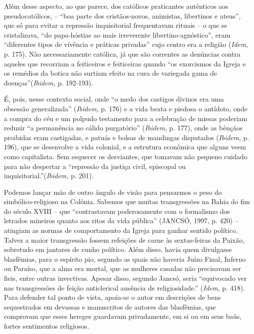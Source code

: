 Além desse aspecto, ao que parece, dos católicos praticantes autênticos
aos pseudocatólicos, -- ``boa parte dos cristãos-novos, animistas,
libertinos e ateus'', que só para evitar a repressão inquisitorial
frequentavam rituais -- o que se cristalizava, ``do papa-hóstias ao mais
irreverente libertino-agnóstico'', eram ``diferentes tipos de vivência e
práticas privadas'' cujo centro era a religião (\emph{Idem}, p. 175).
Não necessariamente católica, já que são correntes as denúncias contra
aqueles que recorriam a feiticeiros e feiticeiras quando ``os exorcismos
da Igreja e os remédios da botica não surtiam efeito na cura de
variegada gama de doenças''(\emph{Ibidem,} p. 192-193).

É, pois, nesse contexto social, onde ``o medo dos castigos divinos era
uma obsessão generalizada'' (\emph{Ibidem,} p. 176) e a vida beata e
piedosa o antídoto, onde a compra do céu e um polpudo testamento para a
celebração de missas poderiam reduzir ``a permanência no cálido
purgatório'' (\emph{Ibidem,} p. 177), onde as bênçãos proibidas eram
castigadas, e patuás e bolsas de mandingas disputados (\emph{Ibidem,} p.
196), que se desenvolve a vida colonial, e a estrutura econômica que
alguns veem como capitalista. Sem esquecer os desviantes, que tomavam
não pequeno cuidado para não despertar a ``repressão da justiça civil,
episcopal ou inquisitorial.''(\emph{Ibidem,} p. 201).

Podemos lançar mão de outro ângulo de visão para pensarmos o peso do
simbólico-religioso na Colônia. Sabemos que muitas transgressões na
Bahia do fim do século XVIII -- que ``contrastavam poderosamente com o
formalismo dos letrados mineiros quanto aos ritos da vida pública''
(JANCSÓ, 1997, p. 420) -- atingiam as normas de comportamento da Igreja
para ganhar sentido político. Talvez a maior transgressão fossem
refeições de carne às sextas-feiras da Paixão, sobretudo em jantares de
cunho político. Além disso, havia quem divulgasse blasfêmias, para o
espírito pio, segundo as quais não haveria Juízo Final, Inferno ou
Paraíso, que a alma era mortal, que as mulheres casadas não precisavam
ser fieis, entre outras invectivas. Apesar disso, segundo Jancsó, seria
``equivocado ver nas transgressões de feição anticlerical ausência de
religiosidade.'' (\emph{Idem}, p. 418). Para defender tal ponto de
vista, apoia-se o autor em descrições de bens sequestrados em devassas e
manuscritos de autores das blasfêmias, que comprovam que esses hereges
guardavam privadamente, em si ou em seus baús, fortes sentimentos
religiosos.

